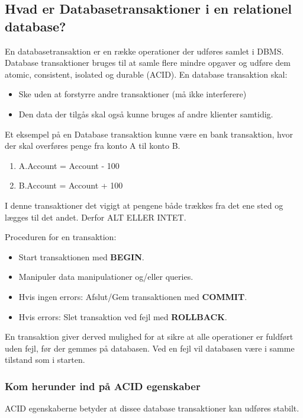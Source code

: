 \newpage

\subsection{Hvad er Databasetransaktioner i en relationel database?}
En databasetransaktion er en række operationer der udføres samlet i DBMS. Database transaktioner bruges til at samle flere mindre opgaver og udføre dem atomic, consistent, isolated og durable (ACID). En database transaktion skal:

\begin{itemize}
	\item Ske uden at forstyrre andre transaktioner (må ikke interferere)
	\item Den data der tilgås skal også kunne bruges af andre klienter samtidig.
\end{itemize}

Et eksempel på en Database transaktion kunne være en bank transaktion, hvor der skal overføres penge fra konto A til konto B.

\begin{enumerate}
	\item A.Account = Account - 100
	\item B.Account = Account + 100 
\end{enumerate}

I denne transaktioner det vigigt at pengene både trækkes fra det ene sted og lægges til det andet. Derfor ALT ELLER INTET.

Proceduren for en transaktion:

\begin{itemize}
	\item Start transaktionen med \textbf{BEGIN}.
	\item Manipuler data manipulationer og/eller queries.
	\item Hvis ingen errors: Afslut/Gem transaktionen med \textbf{COMMIT}.
	\item Hvis errors: Slet transaktion ved fejl med \textbf{ROLLBACK}.
\end{itemize}

En transaktion giver derved mulighed for at sikre at alle operationer er fuldført uden fejl, før der gemmes på databasen. Ved en fejl vil databasen være i samme tilstand som i starten.
\subsubsection{Kom herunder ind på ACID egenskaber}
ACID egenskaberne betyder at dissee database transaktioner kan udføres stabilt.

